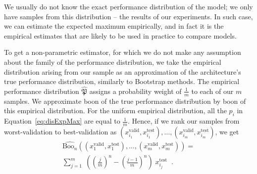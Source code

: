\documentclass{article}
\newcommand{\boo}[1]{\text{Boo}_{#1}}
\newcommand{\tboon}{\gls{boon}\xspace}
\newcommand{\Em}[1]{\boo{#1}}
\newcommand{\emn}{\Em{n}}
\begin{document}
We usually do not know the exact performance distribution of the model; we only have samples from this distribution -- the results of our experiments. In such case, we can estimate the expected maximum empirically, and in fact it is the empirical estimates that are likely to be used in practice to compare models. 

To get a non-parametric estimator, for which we do not make any assumption about the family of the performance distribution, we take the empirical distribution arising from our sample as an approximation of the architecture's true performance distribution, similarly to Bootstrap methods. The empirical performance distribution $\widehat{\mathfrak{P}}$ assigns a probability weight of $\frac{1}{m}$ to each of our $m$ samples. %
We approximate \tboon of the true performance distribution by \tboon of this empirical distribution. For the uniform empirical distribution, all the $p_i$ in Equation~\ref{eq:disExpMax} are equal to $\frac{1}{m}$. Hence, if we rank our samples from worst-validation to best-validation as $(x_{i_1}^\text{valid},x_{i_1}^\text{test}),\dots ,(x_{i_m}^\text{valid},x_{i_m}^\text{test})$, we get
\begin{multline}
 \widehat{\emn} \left((x_1^\text{valid},x_1^\text{test}),\dots ,(x_m^\text{valid},x_m^\text{test})\right) = \\
 \sum_{j=1}^ m\;\left(\left(\frac{j}{m}\right)^n-\left(\frac{j-1}{m}\right)^n \right) \; x_{i_j}^\text{test} \;\;.
\end{multline}

\end{document}
